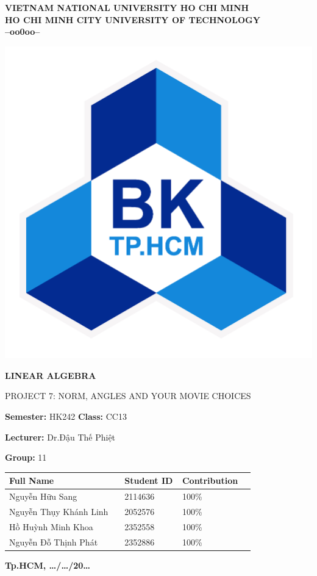 \BgThispage
{}
\fontsize{13}{14}\selectfont

\begin{center}
	\Large\textbf{VIETNAM NATIONAL UNIVERSITY HO CHI MINH \\ HO CHI MINH CITY UNIVERSITY OF TECHNOLOGY\\--oo0oo--}
\end{center}

\vspace{0.5cm}
\begin{center}
	\includegraphics[width=0.3\linewidth]{sections/pic/01_logobachkhoatoi.png}
\end{center}
\vspace{0.4cm}
\begin{center}
	\LARGE\textbf{LINEAR ALGEBRA}
	\vspace{0.1cm}
	
	\Large{PROJECT 7: NORM, ANGLES AND YOUR MOVIE CHOICES  }
\end{center}
\vspace{1cm}

\Large

\textbf{Semester: } HK242 \hspace{4cm} \textbf{Class:} CC13 

\textbf{Lecturer:} Dr.Đậu Thế Phiệt

\textbf{Group:} 11 

\begin{tabular}{| p{0.4\linewidth} | p{0.2\linewidth} | p{0.2\linewidth} |}
	\hline
	Full Name & Student ID & Contribution \\
	\hline
	Nguyễn Hữu Sang & 2114636 & 100\% \\
	\hline
	Nguyễn Thụy Khánh Linh	& 2052576 & 100\% \\
	\hline
	Hồ Huỳnh Minh Khoa	& 2352558 & 100\% \\
	\hline
	Nguyễn Đỗ Thịnh Phát & 2352886	 & 100\% \\
	\hline
\end{tabular}

\vspace{2cm}
\begin{center}
	\fontsize{8pt}{5pt}\selectfont\textbf{Tp.HCM, \dots/\dots/20\dots}
\end{center}

\newpage
{}
\fontsize{13}{14}\selectfont
\tableofcontents
